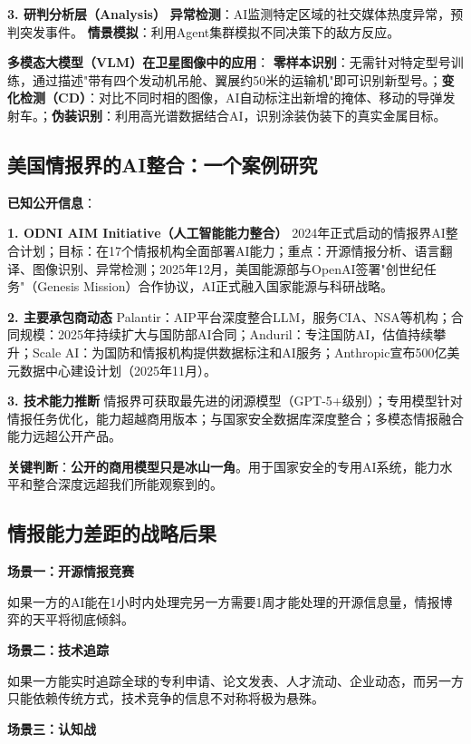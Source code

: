 \textbf{3. 研判分析层（Analysis）}
\textbf{异常检测}：AI监测特定区域的社交媒体热度异常，预判突发事件。 \textbf{情景模拟}：利用Agent集群模拟不同决策下的敌方反应。

\textbf{多模态大模型（VLM）在卫星图像中的应用}：
\textbf{零样本识别}：无需针对特定型号训练，通过描述"带有四个发动机吊舱、翼展约50米的运输机"即可识别新型号。；\textbf{变化检测（CD）}：对比不同时相的图像，AI自动标注出新增的掩体、移动的导弹发射车。；\textbf{伪装识别}：利用高光谱数据结合AI，识别涂装伪装下的真实金属目标。

\subsection{美国情报界的AI整合：一个案例研究}

\textbf{已知公开信息}：

\textbf{1. ODNI AIM Initiative（人工智能能力整合）}
2024年正式启动的情报界AI整合计划；目标：在17个情报机构全面部署AI能力；重点：开源情报分析、语言翻译、图像识别、异常检测；2025年12月，美国能源部与OpenAI签署"创世纪任务"（Genesis Mission）合作协议，AI正式融入国家能源与科研战略。

\textbf{2. 主要承包商动态}
Palantir：AIP平台深度整合LLM，服务CIA、NSA等机构；合同规模：2025年持续扩大与国防部AI合同；Anduril：专注国防AI，估值持续攀升；Scale AI：为国防和情报机构提供数据标注和AI服务；Anthropic宣布500亿美元数据中心建设计划（2025年11月）。

\textbf{3. 技术能力推断}
情报界可获取最先进的闭源模型（GPT-5+级别）；专用模型针对情报任务优化，能力超越商用版本；与国家安全数据库深度整合；多模态情报融合能力远超公开产品。

\textbf{关键判断}：\textbf{公开的商用模型只是冰山一角}。用于国家安全的专用AI系统，能力水平和整合深度远超我们所能观察到的。

\subsection{情报能力差距的战略后果}

\textbf{场景一：开源情报竞赛}

如果一方的AI能在1小时内处理完另一方需要1周才能处理的开源信息量，情报博弈的天平将彻底倾斜。

\textbf{场景二：技术追踪}

如果一方能实时追踪全球的专利申请、论文发表、人才流动、企业动态，而另一方只能依赖传统方式，技术竞争的信息不对称将极为悬殊。

\textbf{场景三：认知战}

